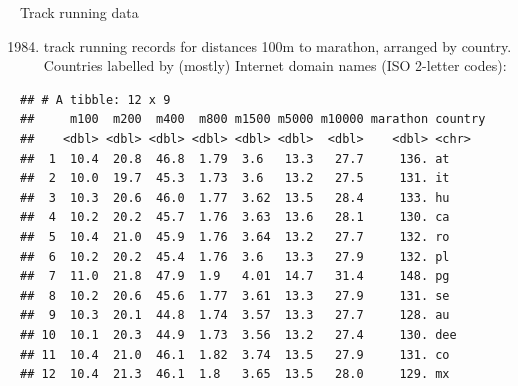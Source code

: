 \documentclass[ignorenonframetext,]{beamer}
\newenvironment{Shaded}{\begin{snugshade}}{\end{snugshade}}
\newcommand{\DecValTok}[1]{\textcolor[rgb]{0.00,0.00,0.81}{#1}}
\newcommand{\KeywordTok}[1]{\textcolor[rgb]{0.13,0.29,0.53}{\textbf{#1}}}
\newcommand{\NormalTok}[1]{#1}
\newcommand{\OperatorTok}[1]{\textcolor[rgb]{0.81,0.36,0.00}{\textbf{#1}}}
\newcommand{\StringTok}[1]{\textcolor[rgb]{0.31,0.60,0.02}{#1}}
\providecommand{\tightlist}{%
  \setlength{\itemsep}{0pt}\setlength{\parskip}{0pt}}
\begin{document}
\begin{frame}[fragile]{Track running data}
\protect\hypertarget{track-running-data}{}

\begin{enumerate}
[(1)]
\setcounter{enumi}{1983}
\tightlist
\item
  track running records for distances 100m to marathon, arranged by
  country. Countries labelled by (mostly) Internet domain names (ISO
  2-letter codes):
\end{enumerate}

\begin{Shaded}
\end{Shaded}

\begin{verbatim}
## # A tibble: 12 x 9
##     m100  m200  m400  m800 m1500 m5000 m10000 marathon country
##    <dbl> <dbl> <dbl> <dbl> <dbl> <dbl>  <dbl>    <dbl> <chr>  
##  1  10.4  20.8  46.8  1.79  3.6   13.3   27.7     136. at     
##  2  10.0  19.7  45.3  1.73  3.6   13.2   27.5     131. it     
##  3  10.3  20.6  46.0  1.77  3.62  13.5   28.4     133. hu     
##  4  10.2  20.2  45.7  1.76  3.63  13.6   28.1     130. ca     
##  5  10.4  21.0  45.9  1.76  3.64  13.2   27.7     132. ro     
##  6  10.2  20.2  45.4  1.76  3.6   13.3   27.9     132. pl     
##  7  11.0  21.8  47.9  1.9   4.01  14.7   31.4     148. pg     
##  8  10.2  20.6  45.6  1.77  3.61  13.3   27.9     131. se     
##  9  10.3  20.1  44.8  1.74  3.57  13.3   27.7     128. au     
## 10  10.1  20.3  44.9  1.73  3.56  13.2   27.4     130. dee    
## 11  10.4  21.0  46.1  1.82  3.74  13.5   27.9     131. co     
## 12  10.4  21.3  46.1  1.8   3.65  13.5   28.0     129. mx
\end{verbatim}

\end{frame}
\end{document}
